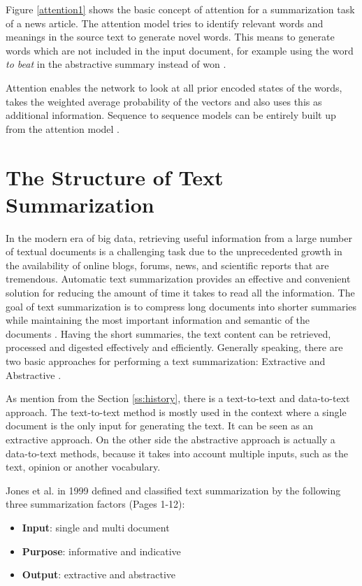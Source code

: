 Figure \ref{attention1} shows the basic concept of attention for a summarization task of a news article.  The attention model tries to identify relevant words and meanings in the source text to generate novel words. This means to generate words which are not included in the input document, for example using the word \textit{to beat} in the abstractive summary instead of won \cite{see-etal-2017-get}.

Attention enables the network to look at all prior encoded states of the words, takes the weighted average probability of the vectors and also uses this as additional information. Sequence to sequence models can be entirely built up from the attention model \cite{attention2}. 

\section{The Structure of Text Summarization}

In the modern era of big data, retrieving useful information from a large number of textual documents is a challenging task due to the unprecedented growth in the availability of online blogs, forums, news, and scientific reports that are tremendous. Automatic text summarization provides an effective and convenient solution for reducing the amount of time it takes to read all the information. The goal of text summarization is to compress long documents into shorter summaries while maintaining the most important information and semantic of the documents \cite{ts-intro} \cite{ts-intro2}. Having the short summaries, the text content can be retrieved, processed and digested effectively and efficiently. 
Generally speaking, there are two basic approaches for performing a text summarization: Extractive and Abstractive \cite{ts-intro3}. 

As mention from the Section \ref{ss:history}, there is a text-to-text and data-to-text approach. The text-to-text method is mostly used in the context where a single document is the only input for generating the text. It can be seen as an extractive approach.  On the other side the abstractive approach is actually a data-to-text methods, because it takes into account multiple inputs, such as the text, opinion or another vocabulary.

Jones et al. in 1999 defined and classified text summarization by the following three summarization factors \cite{Jones98automaticsummarising:} (Pages 1-12):

\begin{itemize}
	\item \textbf{Input}: single and multi document
	\item \textbf{Purpose}: informative and indicative
	\item \textbf{Output}: extractive and abstractive
\end{itemize}

